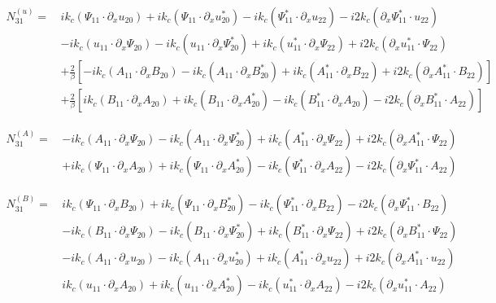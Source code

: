 \documentclass{emulateapj}
\newcommand{\beq}{\begin{equation}}
\newcommand{\eeq}{\end{equation}}
\begin{document}
\beq
\begin{split}
N_{31}^{(u)} = \, & i k_c \left(\Psi_{11} \cdot \partial_x u_{20}\right) + i k_c \left(\Psi_{11} \cdot \partial_x u_{20}^*\right) - i k_c \left(\Psi_{11}^* \cdot \partial_x u_{22}\right) - i 2 k_c \left(\partial_x \Psi_{11}^* \cdot u_{22}\right) \\
& - i k_c \left(u_{11} \cdot \partial_x \Psi_{20} \right) - i k_c \left(u_{11} \cdot \partial_x \Psi_{20}^*\right) + i k_c \left(u_{11}^* \cdot \partial_x \Psi_{22} \right) + i 2 k_c \left(\partial_x u_{11}^* \cdot \Psi_{22}\right) \\
& +\frac{2}{\beta}\left[- i k_c \left(A_{11} \cdot \partial_x B_{20}\right) - i k_c \left(A_{11} \cdot \partial_x B_{20}^*\right) + i k_c \left(A_{11}^* \cdot \partial_x B_{22}\right) + i 2 k_c \left(\partial_x A_{11}^* \cdot B_{22}\right)\right] \\
& +\frac{2}{\beta}\left[ i k_c \left(B_{11} \cdot \partial_x A_{20}\right) + i k_c \left(B_{11} \cdot \partial_x A_{20}^*\right) - i k_c \left(B_{11}^* \cdot \partial_x A_{20}\right) - i 2 k_c \left(\partial_x B_{11}^* \cdot A_{22}\right)\right]
\end{split}
\eeq

\beq
\begin{split}
N_{31}^{(A)} =\, & -i k_c \left(A_{11}\cdot\partial_x \Psi_{20}\right) - i k_c \left(A_{11} \cdot \partial_x \Psi_{20}^*\right)
 + i k_c \left(A_{11}^* \cdot \partial_x \Psi_{22}\right) + i 2 k_c \left(\partial_x A_{11}^* \cdot \Psi_{22}\right) \\
 & + i k_c \left(\Psi_{11} \cdot \partial_x A_{20}\right) + i k_c \left(\Psi_{11} \cdot \partial_x A_{20}^*\right) - i k_c \left(\Psi_{11}^* \cdot \partial_x A_{22} \right) - i 2 k_c \left(\partial_x \Psi_{11}^* \cdot A_{22}\right)
\end{split}
\eeq

\beq
\begin{split}
N_{31}^{(B)} = \, & i k_c \left(\Psi_{11} \cdot \partial_x B_{20}\right) + i k_c \left(\Psi_{11} \cdot \partial_x B_{20}^*\right) - i k_c \left(\Psi_{11}^* \cdot \partial_x B_{22}\right) - i 2 k_c\left(\partial_x \Psi_{11}^* \cdot B_{22}\right) \\
& - i k_c \left(B_{11} \cdot \partial_x \Psi_{20}\right) - i k_c \left(B_{11} \cdot \partial_x \Psi_{20}^*\right) + i k_c\left(B_{11}^* \cdot \partial_x \Psi_{22}\right) + i 2 k_c \left(\partial_x B_{11}^* \cdot \Psi_{22}\right) \\
& - i k_c \left(A_{11} \cdot \partial_x u_{20}\right) - i k_c \left(A_{11} \cdot \partial_x u_{20}^*\right) + i k_c \left(A_{11}^* \cdot \partial_x u_{22}\right) + i 2 k_c \left(\partial_x A_{11}^* \cdot u_{22}\right) \\
& i k_c \left(u_{11} \cdot \partial_x A_{20} \right) + i k_c \left(u_{11} \cdot \partial_x A_{20}^*\right) - i k_c \left(u_{11}^* \cdot \partial_x A_{22}\right) - i 2 k_c \left(\partial_x u_{11}^* \cdot A_{22}\right)
\end{split}
\eeq
\end{document}
